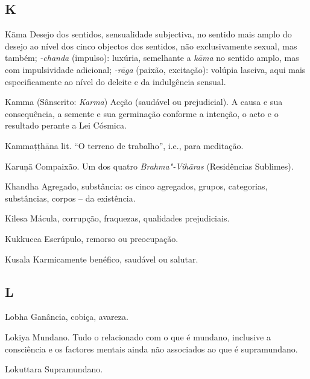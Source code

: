 \subsection{K}

\begin{glossarydescription}

\item[Kāma] Desejo dos sentidos, sensualidade subjectiva, no sentido mais
amplo do desejo ao nível dos cinco objectos dos sentidos, não exclusivamente
sexual, mas também; \emph{-chanda} (impulso): luxúria, semelhante a
\emph{kāma} no sentido amplo, mas com impulsividade adicional; \emph{-rāga}
(paixão, excitação): volúpia lasciva, aqui mais especificamente ao nível do
deleite e da indulgência sensual.

\item[Kamma] (Sânscrito: \emph{Karma}) Acção (saudável ou prejudicial). A causa
e sua consequência, a semente e sua germinação conforme a intenção, o acto e o
resultado perante a Lei Cósmica.

\item[Kammaṭṭhāna] lit. “O terreno de trabalho”, i.e., para meditação.

\item[Karuṇā] Compaixão. Um dos quatro \emph{Brahma"-Vihāras} (Residências Sublimes).

\item[Khandha] Agregado, substância: os cinco agregados, grupos, categorias,
substâncias, corpos -- da existência.

\item[Kilesa] Mácula, corrupção, fraquezas, qualidades prejudiciais.

\item[Kukkucca] Escrúpulo, remorso ou preocupação.

\item[Kusala] Karmicamente benéfico, saudável ou salutar.

\end{glossarydescription}

\subsection{L}

\begin{glossarydescription}

\item[Lobha] Ganância, cobiça, avareza.

\item[Lokiya] Mundano. Tudo o relacionado com o que é mundano, inclusive a
consciência e os factores mentais ainda não associados ao que é supramundano.

\item[Lokuttara] Supramundano.

\end{glossarydescription}

